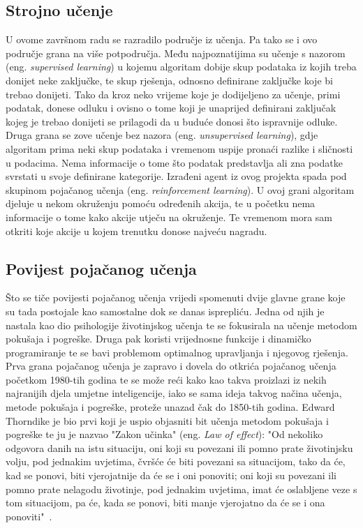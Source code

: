 \subsection{Strojno učenje}
U ovome završnom radu se razradilo područje iz učenja. Pa tako se i ovo područje grana na više potpodručja. Među najpoznatijima su učenje s nazorom (eng. \textit{supervised learning}) u kojemu algoritam dobije skup podataka iz kojih treba donijet neke zaključke, te skup rješenja, odnosno definirane zaključke koje bi trebao donijeti. Tako da kroz neko vrijeme koje je dodijeljeno za učenje, primi podatak, donese odluku i ovisno 
o tome koji je unaprijed definirani zaključak kojeg je trebao donijeti se prilagodi da u buduće donosi što ispravnije odluke. Druga grana se zove učenje bez nazora (eng. \textit{unsupervised learning}), gdje algoritam prima neki skup podataka i vremenom uspije pronaći razlike i sličnosti u podacima. Nema informacije o tome što podatak predstavlja ali zna podatke svrstati u svoje definirane kategorije. Izrađeni agent iz ovog projekta spada pod skupinom pojačanog učenja (eng. \textit{reinforcement learning}). U ovoj grani algoritam djeluje u nekom okruženju pomoću određenih akcija, te u početku nema informacije o tome kako akcije utječu na okruženje. Te vremenom mora sam otkriti koje akcije u kojem trenutku donose najveću nagradu.


\subsection{Povijest pojačanog učenja}
Što se tiče povijesti pojačanog učenja vrijedi spomenuti dvije glavne grane koje su tada postojale kao samostalne dok se danas isprepliću. Jedna od njih je nastala kao dio psihologije životinjskog učenja te se fokusirala na učenje metodom pokušaja i pogreške. Druga pak koristi vrijednosne funkcije i dinamičko programiranje te se bavi problemom optimalnog upravljanja i njegovog rješenja. Prva grana pojačanog učenja je zapravo i dovela do otkrića pojačanog učenja početkom 1980-tih godina te se može reći kako kao takva proizlazi iz nekih najranijih djela umjetne inteligencije, iako se sama ideja takvog načina učenja, metode pokušaja i pogreške, proteže unazad čak do 1850-tih godina. Edward Thorndike je bio prvi koji je uspio objasniti bit učenja metodom pokušaja i pogreške te ju je nazvao "Zakon učinka" (eng. \textit{Law of effect}): "Od nekoliko odgovora danih na istu situaciju, oni koji su povezani ili pomno prate životinjsku volju, pod jednakim uvjetima, čvršće će biti povezani sa situacijom, tako da će, kad se ponovi, biti vjerojatnije da će se i oni ponoviti; oni koji su povezani ili pomno prate nelagodu životinje, pod jednakim uvjetima, imat će oslabljene veze s tom situacijom, pa će, kada se ponovi, biti manje vjerojatno da će se i ona ponoviti"~\cite{reinforcement_learning}.

